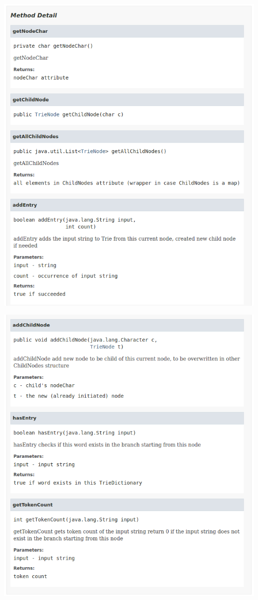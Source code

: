 \documentclass[12pt]{article}
\begin{document}
\begin{center}
	\includegraphics[width=\textwidth]{trie_node_methods}
\end{center}
\begin{center}
	\includegraphics[width=\textwidth]{trie_node_methods_b}
\end{center}
\end{document}
